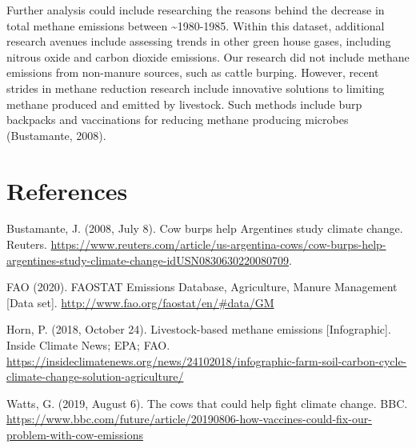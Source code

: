 \documentclass[
  12pt,
]{article}
\begin{document}
Further analysis could include researching the reasons behind the
decrease in total methane emissions between \textasciitilde1980-1985.
Within this dataset, additional research avenues include assessing
trends in other green house gases, including nitrous oxide and carbon
dioxide emissions. Our research did not include methane emissions from
non-manure sources, such as cattle burping. However, recent strides in
methane reduction research include innovative solutions to limiting
methane produced and emitted by livestock. Such methods include burp
backpacks and vaccinations for reducing methane producing microbes
(Bustamante, 2008).

\newpage

\hypertarget{references}{%
\section{References}\label{references}}

Bustamante, J. (2008, July 8). Cow burps help Argentines study climate
change. Reuters.
\url{https://www.reuters.com/article/us-argentina-cows/cow-burps-help-argentines-study-climate-change-idUSN0830630220080709}.

FAO (2020). FAOSTAT Emissions Database, Agriculture, Manure Management
{[}Data set{]}. \url{http://www.fao.org/faostat/en/\#data/GM}

Horn, P. (2018, October 24). Livestock-based methane emissions
{[}Infographic{]}. Inside Climate News; EPA; FAO.
\url{https://insideclimatenews.org/news/24102018/infographic-farm-soil-carbon-cycle-climate-change-solution-agriculture/}

Watts, G. (2019, August 6). The cows that could help fight climate
change. BBC.
\url{https://www.bbc.com/future/article/20190806-how-vaccines-could-fix-our-problem-with-cow-emissions}
\end{document}
